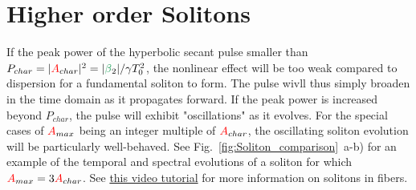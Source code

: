 \section{Higher order Solitons}
If the peak power of the hyperbolic secant pulse smaller than $P_{char}=|\A_{char}|^2=|\betag_2|/\gamma T_0^2$, the nonlinear effect will be too weak compared to dispersion for a fundamental soliton to form. The pulse wivll thus simply broaden in the time domain as it propagates forward. If the peak power is increased beyond $P_{char}$, the pulse will exhibit "oscillations" as it evolves. For the special cases of $\textcolor{red}{A}_{max}$ being an integer multiple of $\textcolor{red}{A}_{char}$, the oscillating soliton evolution will be particularly well-behaved. See Fig.~\ref{fig:Soliton_comparison}~a-b) for an example of the temporal and spectral evolutions of a soliton for which $\textcolor{red}{A}_{max}=3\textcolor{red}{A}_{char}$. See \href{https://youtu.be/KAZ7pCQ-x8Y}{this video tutorial} for more information on solitons in fibers. 

